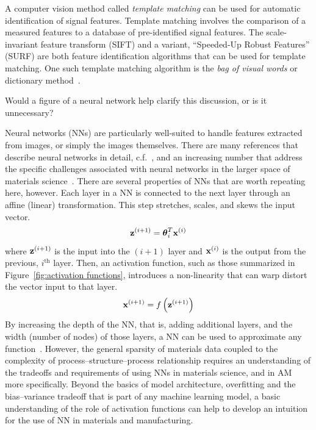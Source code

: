 A computer vision method called  \textit{template matching} can be used for automatic identification of signal features. Template matching involves the comparison of a measured features to a database of pre-identified signal features. The scale-invariant feature transform (SIFT) \cite{Lowe2004} and a variant, ``Speeded-Up Robust Features'' (SURF) \cite{Bay2008} are both feature identification algorithms that can be used for template matching. One such template matching algorithm is the \emph{bag of visual words} or dictionary method~\cite{DeCost2015}.%

{\color{red} Would a figure of a neural network help clarify this discussion, or is it unnecessary?}

Neural networks (NNs) are particularly well-suited to handle features extracted from images, or simply the images themselves. There are many references that describe neural networks in detail, c.f.~\citet{Hastie2009}, and an increasing number that address the specific challenges associated with neural networks in the larger space of materials science~\cite{Bhadeshia2009}. There are several properties of NNs that are worth repeating here, however. Each layer in a NN is connected to the next layer through an affine (linear) transformation. This step stretches, scales, and skews the input vector.
\[
	{\bold z}^{(i+1)} = \boldsymbol \theta_i^T {\bold x}^{(i)}
\]
where ${\bold z}^{(i+1)}$ is the input into the $(i+1)$ layer and ${\bold x}^{(i)}$ is the output from the previous, $i^\textrm{th}$ layer. Then, an activation function, such as those summarized in Figure~\ref{fig:activation functions}, introduces a non-linearity that can warp distort the vector input to that layer.
\[
	{\bold x}^{(i+1)} = f \left( {\bold z}^{(i+1)} \right)
\]
By increasing the depth of the NN, that is, adding additional layers, and the width (number of nodes) of those layers, a NN can be used to approximate any function~\cite{Hornik1989}. However, the general sparsity of materials data coupled to the complexity of process--structure--process relationship requires an understanding of the tradeoffs and requirements of using NNs in materials science, and in AM more specifically. Beyond the basics of model architecture, overfitting and the bias--variance tradeoff that is part of any machine learning model, a basic understanding of the role of activation functions can help to develop an intuition for the use of NN in materials and manufacturing.

